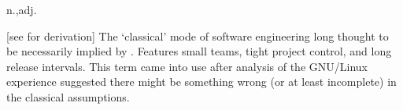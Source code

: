  n.,adj.

[see  for derivation] The `classical' mode of software
engineering long thought to be necessarily implied by .
Features small teams, tight project control, and long release intervals. This
term came into use after analysis of the GNU/Linux experience suggested there
might be something wrong (or at least incomplete) in the classical assumptions.

